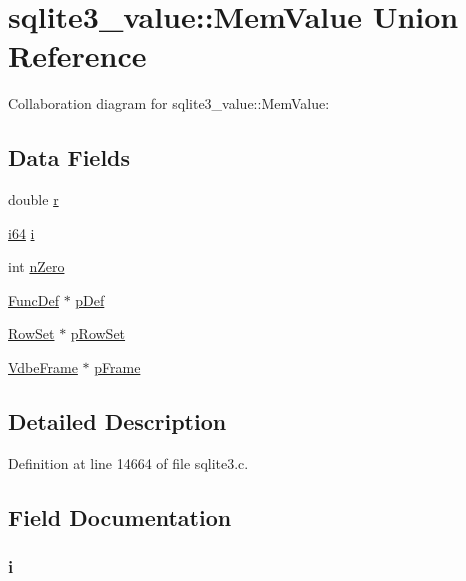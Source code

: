 \hypertarget{union_mem_1_1_mem_value}{}\section{sqlite3\+\_\+value\+:\+:Mem\+Value Union Reference}
\label{union_mem_1_1_mem_value}


Collaboration diagram for sqlite3\+\_\+value\+:\+:Mem\+Value\+:
\subsection*{Data Fields}
\begin{DoxyCompactItemize}
\item 
double \hyperlink{union_mem_1_1_mem_value_a880a49112fedae68e714341a9a082fb6}{r}
\item 
\hyperlink{sqlite3_8c_a2a0f0f4ae7001eb54351f77ea1cdbcfd}{i64} \hyperlink{union_mem_1_1_mem_value_a42e49a9fe14f213f132f6817fcb4a97b}{i}
\item 
int \hyperlink{union_mem_1_1_mem_value_aac4adea394a18cc831013e53685e05eb}{n\+Zero}
\item 
\hyperlink{struct_func_def}{Func\+Def} $\ast$ \hyperlink{union_mem_1_1_mem_value_a09b4cd9b3fcd86a6d7d9ec00b185ec25}{p\+Def}
\item 
\hyperlink{struct_row_set}{Row\+Set} $\ast$ \hyperlink{union_mem_1_1_mem_value_abca52c9345f143f58a581345e0afd619}{p\+Row\+Set}
\item 
\hyperlink{struct_vdbe_frame}{Vdbe\+Frame} $\ast$ \hyperlink{union_mem_1_1_mem_value_ad71093eb5e589645373a69f115714ec7}{p\+Frame}
\end{DoxyCompactItemize}


\subsection{Detailed Description}


Definition at line 14664 of file sqlite3.\+c.



\subsection{Field Documentation}
\hypertarget{union_mem_1_1_mem_value_a42e49a9fe14f213f132f6817fcb4a97b}{}
\subsubsection[{i}]{ i}\label{union_mem_1_1_mem_value_a42e49a9fe14f213f132f6817fcb4a97b}


